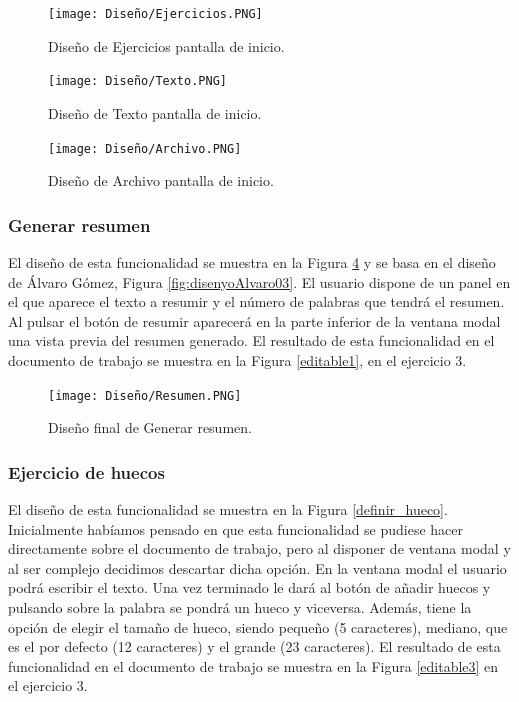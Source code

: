 \begin{figure}[ht!]
  \centering
  \texttt{[image: Diseño/Ejercicios.PNG]}
  \caption{Diseño de Ejercicios pantalla de inicio.}
  \label{ejercicios}
\end{figure}

\begin{figure}[ht!]
  \centering
  \texttt{[image: Diseño/Texto.PNG]}
  \caption{Diseño de Texto pantalla de inicio.}
  \label{texto}
\end{figure}

\begin{figure}[ht!]
  \centering
  \texttt{[image: Diseño/Archivo.PNG]}
  \caption{Diseño de Archivo pantalla de inicio.}
  \label{archivo}
\end{figure}

\subsubsection{Generar resumen}
El diseño de esta funcionalidad se muestra en la Figura \ref{resuemn} y se basa en el diseño de Álvaro Gómez, Figura \ref{fig:disenyoAlvaro03}. El usuario dispone de un panel en el que aparece el texto a resumir y el número de palabras que tendrá el resumen. Al pulsar el botón de resumir aparecerá en la parte inferior de la ventana modal una vista previa del resumen generado. El resultado de esta funcionalidad en el documento de trabajo se muestra en la Figura \ref{editable1}, en el ejercicio 3.

\begin{figure}[ht!]
  \centering
  \texttt{[image: Diseño/Resumen.PNG]}
  \caption{Diseño final de Generar resumen.}
  \label{resuemn}
\end{figure}

\subsubsection{Ejercicio de huecos}
El diseño de esta funcionalidad se muestra en la Figura \ref{definir_hueco}. Inicialmente habíamos pensado en que esta funcionalidad se pudiese hacer directamente sobre el documento de trabajo, pero al disponer de ventana modal y al ser complejo decidimos descartar dicha opción. En la ventana modal el usuario podrá escribir el texto. Una vez terminado le dará al botón de añadir huecos y pulsando sobre la palabra se pondrá un hueco y viceversa. Además, tiene la opción de elegir el tamaño de hueco, siendo pequeño (5 caracteres), mediano, que es el por defecto (12 caracteres) y el grande (23 caracteres). El resultado de esta funcionalidad en el documento de trabajo se muestra en la Figura \ref{editable3} en el ejercicio 3.

